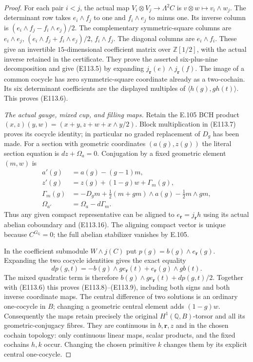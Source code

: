 \begin{proof}
For each pair $i<j$, the actual map
$V_i\otimes V_j\to\Lambda^2C$ is
$v\otimes w\mapsto v_i\wedge w_j$.
The determinant row takes $e_i\wedge f_j$ to one and
$f_i\wedge e_j$ to minus one.  Its inverse column is
$(e_i\wedge f_j-f_i\wedge e_j)/2$.
The complementary symmetric-square columns are
$e_i\wedge e_j$,
$(e_i\wedge f_j+f_i\wedge e_j)/2$,
$f_i\wedge f_j$.
The diagonal columns are $e_i\wedge f_i$.
These give an invertible $15$-dimensional coefficient matrix
over $\mathbb Z[1/2]$, with the actual inverse retained in the
certificate.  They prove the asserted six-plus-nine decomposition
and give (E113.5) by expanding
$j_{\mathbf r}(e)\wedge j_{\mathbf r}(f)$.
The image of a common cocycle has zero symmetric-square
coordinate already as a two-cochain.  Its six determinant
coefficients are the displayed multiples of
$\langle h(g),g h(t)\rangle$.  This proves (E113.6).

\emph{The actual gauge, mixed cup, and filling maps.}
Retain the E.105 BCH product
$(x,z)(y,w)=(x+y,z+w+x\wedge y/2)$.
Block multiplication in (E113.7) proves its cocycle identity;
in particular no graded replacement of $D_g$ has been made.
For a section with geometric coordinates $(a(g),z(g))$ the
literal section equation is $dz+\Omega_a=0$.
Conjugation by a fixed geometric element $(m,w)$ is
\[
 \begin{split}
 a'(g)&=a(g)-(g-1)m,\\
 z'(g)&=z(g)+(1-g)w+\Gamma_m(g),\\
 \Gamma_m(g)&=-D_gm+\tfrac12(m+gm)\wedge a(g)
                              -\tfrac12m\wedge gm,\\
 \Omega_{a'}&=\Omega_a-d\Gamma_m.
 \end{split}
 \tag{E113.16}
\]
Thus any given compact representative can be aligned to
$e_{\mathbf r}=j_{\mathbf r}h$ using its actual abelian
coboundary and (E113.16).  The aligning compact vector is
unique because $C^{G_{\mathbb Q}}=0$; the full abelian
stabilizer vanishes by E.105.

In the coefficient submodule $W\wedge j(C)$ put
$p(g)=b(g)\wedge e_{\mathbf r}(g)$.
Expanding the two cocycle identities gives the exact equality
\[
 dp(g,t)=-b(g)\wedge g e_{\mathbf r}(t)
                         +e_{\mathbf r}(g)\wedge g b(t).
 \tag{E113.17}
\]
The mixed quadratic term is therefore
$b(g)\wedge g e_{\mathbf r}(t)+dp(g,t)/2$.
Together with (E113.6) this proves (E113.8)--(E113.9), including
both signs and both inverse coordinate maps.
The central difference of two solutions is an ordinary
one-cocycle in $B$; changing a geometric central element adds
$(1-g)w$.  Consequently the maps retain precisely the original
$H^1(\mathbb Q,B)$-torsor and all its geometric-conjugacy fibres.
They are continuous in $b,\mathbf r,z$ and in the chosen
cochain topology: only continuous linear maps, scalar products,
and the fixed cochains $h,k$ occur.  Changing the chosen
primitive $k$ changes them by its explicit central one-cocycle.


\end{proof}
